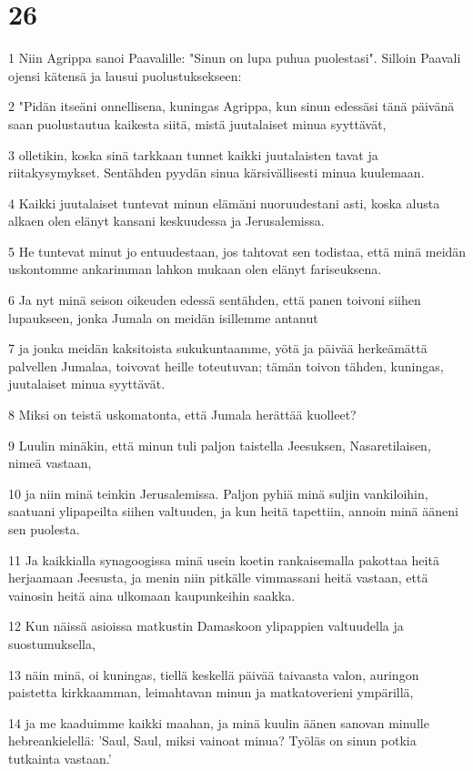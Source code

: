 \chapter{26}

\par 1 Niin Agrippa sanoi Paavalille: "Sinun on lupa puhua puolestasi". Silloin Paavali ojensi kätensä ja lausui puolustuksekseen:
\par 2 "Pidän itseäni onnellisena, kuningas Agrippa, kun sinun edessäsi tänä päivänä saan puolustautua kaikesta siitä, mistä juutalaiset minua syyttävät,
\par 3 olletikin, koska sinä tarkkaan tunnet kaikki juutalaisten tavat ja riitakysymykset. Sentähden pyydän sinua kärsivällisesti minua kuulemaan.
\par 4 Kaikki juutalaiset tuntevat minun elämäni nuoruudestani asti, koska alusta alkaen olen elänyt kansani keskuudessa ja Jerusalemissa.
\par 5 He tuntevat minut jo entuudestaan, jos tahtovat sen todistaa, että minä meidän uskontomme ankarimman lahkon mukaan olen elänyt fariseuksena.
\par 6 Ja nyt minä seison oikeuden edessä sentähden, että panen toivoni siihen lupaukseen, jonka Jumala on meidän isillemme antanut
\par 7 ja jonka meidän kaksitoista sukukuntaamme, yötä ja päivää herkeämättä palvellen Jumalaa, toivovat heille toteutuvan; tämän toivon tähden, kuningas, juutalaiset minua syyttävät.
\par 8 Miksi on teistä uskomatonta, että Jumala herättää kuolleet?
\par 9 Luulin minäkin, että minun tuli paljon taistella Jeesuksen, Nasaretilaisen, nimeä vastaan,
\par 10 ja niin minä teinkin Jerusalemissa. Paljon pyhiä minä suljin vankiloihin, saatuani ylipapeilta siihen valtuuden, ja kun heitä tapettiin, annoin minä ääneni sen puolesta.
\par 11 Ja kaikkialla synagoogissa minä usein koetin rankaisemalla pakottaa heitä herjaamaan Jeesusta, ja menin niin pitkälle vimmassani heitä vastaan, että vainosin heitä aina ulkomaan kaupunkeihin saakka.
\par 12 Kun näissä asioissa matkustin Damaskoon ylipappien valtuudella ja suostumuksella,
\par 13 näin minä, oi kuningas, tiellä keskellä päivää taivaasta valon, auringon paistetta kirkkaamman, leimahtavan minun ja matkatoverieni ympärillä,
\par 14 ja me kaaduimme kaikki maahan, ja minä kuulin äänen sanovan minulle hebreankielellä: 'Saul, Saul, miksi vainoat minua? Työläs on sinun potkia tutkainta vastaan.'

